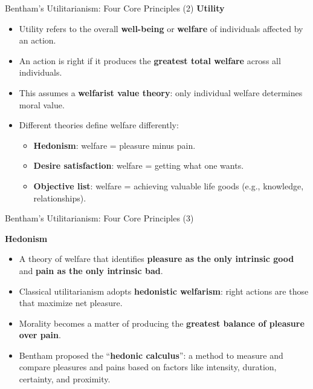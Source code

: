 \documentclass[aspectratio=169, 10pt]{beamer}
\begin{document}
\begin{frame}{Bentham’s Utilitarianism: Four Core Principles (2)}
    \textbf{Utility}
    \begin{itemize}
        \item Utility refers to the overall \textbf{well-being} or \textbf{welfare} of individuals affected by an action.
        \item An action is right if it produces the \textbf{greatest total welfare} across all individuals.
        \item This assumes a \textbf{welfarist value theory}: only individual welfare determines moral value.
        \item Different theories define welfare differently:
            \begin{itemize}
                \item \textbf{Hedonism}: welfare = pleasure minus pain.
                \item \textbf{Desire satisfaction}: welfare = getting what one wants.
                \item \textbf{Objective list}: welfare = achieving valuable life goods (e.g., knowledge, relationships).
            \end{itemize}
    \end{itemize}
\end{frame}

\begin{frame}{Bentham’s Utilitarianism: Four Core Principles (3)}

\textbf{Hedonism}
\begin{itemize}
    \item A theory of welfare that identifies \textbf{pleasure as the only intrinsic good} and \textbf{pain as the only intrinsic bad}.
    \item Classical utilitarianism adopts \textbf{hedonistic welfarism}: right actions are those that maximize net pleasure.
    \item Morality becomes a matter of producing the \textbf{greatest balance of pleasure over pain}.
    \item Bentham proposed the “\textbf{hedonic calculus}”: a method to measure and compare pleasures and pains based on factors like intensity, duration, certainty, and proximity.
\end{itemize}

\end{frame}
\end{document}
